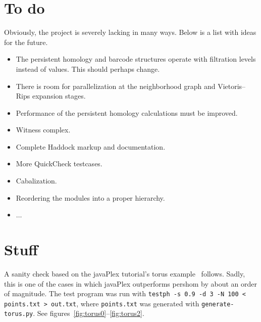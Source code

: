 \documentclass[a4paper,10pt]{article}
\begin{document}
\section{To do}
Obviously, the project is severely lacking in many ways. Below is a
list with ideas for the future.
\begin{itemize}
  \item The persistent homology and barcode structures operate with
    filtration levels instead of values. This should perhaps change.
  \item There is room for parallelization at the neighborhood graph
    and Vietoris--Rips expansion stages.
  \item Performance of the persistent homology calculations must be
    improved.
  \item Witness complex.
  \item Complete Haddock markup and documentation.
  \item More QuickCheck testcases.
  \item Cabalization.
  \item Reordering the modules into a proper hierarchy.
  \item $\dots$
\end{itemize}

\section{Stuff}
A sanity check based on the javaPlex tutorial's torus
example~\citep{javaplextut} follows. Sadly, this is one of the cases
in which javaPlex outperforms pershom by about an order of
magnitude. The test program was run with \texttt{testph -s 0.9 -d 3
  -N 100 < points.txt > out.txt}, where \texttt{points.txt} was
generated with \texttt{generate-torus.py}. See
figures~\ref{fig:torus0}--\ref{fig:torus2}.
\end{document}
